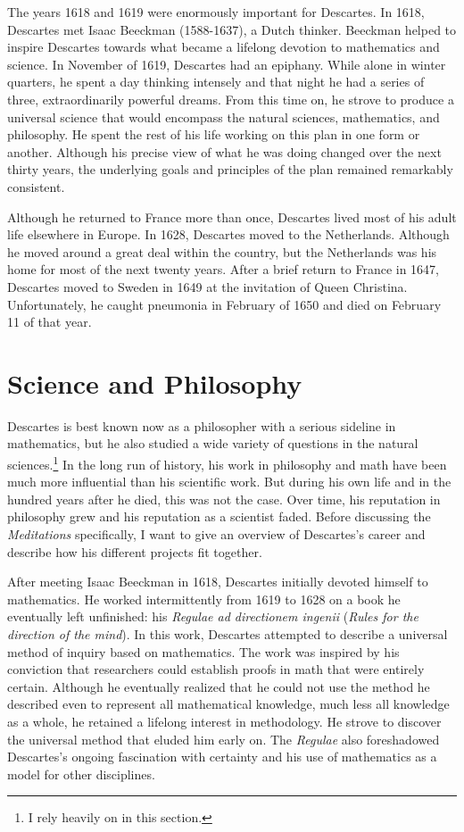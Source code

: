 The years 1618 and 1619 were enormously important for Descartes. In 1618, Descartes met Isaac Beeckman (1588-1637), a Dutch thinker. Beeckman helped to inspire Descartes towards what became a lifelong devotion to mathematics and science. In November of 1619, Descartes had an epiphany. While alone in winter quarters, he spent a day thinking intensely and that night he had a series of three, extraordinarily powerful dreams. From this time on, he strove to produce a universal science that would encompass the natural sciences, mathematics, and philosophy. He spent the rest of his life working on this plan in one form or another. Although his precise view of what he was doing changed over the next thirty years, the underlying goals and principles of the plan remained remarkably consistent.

Although he returned to France more than once, Descartes lived most of his adult life elsewhere in Europe. In 1628, Descartes moved to the Netherlands. Although he moved around a great deal within the country, but the Netherlands was his home for most of the next twenty years. After a brief return to France in 1647, Descartes moved to Sweden in 1649 at the invitation of Queen Christina. Unfortunately, he caught pneumonia in February of 1650 and died on February 11 of that year.

\section*{Science and Philosophy}

Descartes is best known now as a philosopher with a serious sideline in mathematics, but he also studied a wide variety of questions in the natural sciences.\footnote{I rely heavily on \textcite{gaukroger2011} in this section.} In the long run of history, his work in philosophy and math have been much more influential than his scientific work. But during his own life and in the hundred years after he died, this was not the case. Over time, his reputation in philosophy grew and his reputation as a scientist faded. Before discussing the \textit{Meditations} specifically, I want to give an overview of Descartes's career and describe how his different projects fit together.

After meeting Isaac Beeckman in 1618, Descartes initially devoted himself to mathematics. He worked intermittently from 1619 to 1628 on a book he eventually left unfinished: his \textit{Regulae ad directionem ingenii} (\textit{Rules for the direction of the mind}). In this work, Descartes attempted to describe a universal method of inquiry based on mathematics. The work was inspired by his conviction that researchers could establish proofs in math that were entirely certain. Although he eventually realized that he could not use the method he described even to represent all mathematical knowledge, much less all knowledge as a whole, he retained a lifelong interest in methodology. He strove to discover the universal method that eluded him early on. The \textit{Regulae} also foreshadowed Descartes's ongoing fascination with certainty and his use of mathematics as a model for other disciplines.


